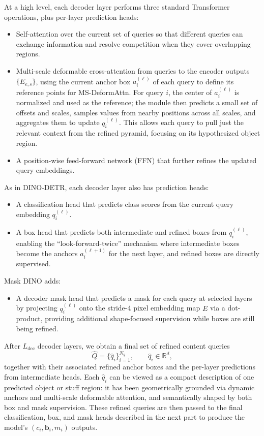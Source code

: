 \begin{enrichment}
\begin{enrichment}
		At a high level, each decoder layer performs three standard Transformer operations, plus per-layer prediction heads:
		\begin{itemize}
			\item Self-attention over the current set of queries so that different queries can exchange information and resolve competition when they cover overlapping regions.
			\item Multi-scale deformable cross-attention from queries to the encoder outputs $\{E_{e,s}\}$, using the current anchor box $a_i^{(\ell)}$ of each query to define its reference points for MS-DeformAttn.
			For query $i$, the center of $a_i^{(\ell)}$ is normalized and used as the reference; the module then predicts a small set of offsets and scales, samples values from nearby positions across all scales, and aggregates them to update $q_i^{(\ell)}$.
			This allows each query to pull just the relevant context from the refined pyramid, focusing on its hypothesized object region.
			\item A position-wise feed-forward network (FFN) that further refines the updated query embeddings.
		\end{itemize}
		
		As in DINO-DETR, each decoder layer also has prediction heads:
		\begin{itemize}
			\item A classification head that predicts class scores from the current query embedding $q_i^{(\ell)}$.
			\item A box head that predicts both intermediate and refined boxes from $q_i^{(\ell)}$, enabling the ``look-forward-twice'' mechanism where intermediate boxes become the anchors $a_i^{(\ell+1)}$ for the next layer, and refined boxes are directly supervised.
		\end{itemize}
		Mask DINO adds:
		\begin{itemize}
			\item A decoder mask head that predicts a mask for each query at selected layers by projecting $q_i^{(\ell)}$ onto the stride-4 pixel embedding map $E$ via a dot-product, providing additional shape-focused supervision while boxes are still being refined.
		\end{itemize}
		
		After $L_{\text{dec}}$ decoder layers, we obtain a final set of refined content queries
		\[
		\hat Q = \{\hat q_i\}_{i=1}^{N_q}, \qquad \hat q_i \in \mathbb{R}^d,
		\]
		together with their associated refined anchor boxes and the per-layer predictions from intermediate heads.
		Each $\hat q_i$ can be viewed as a compact description of one predicted object or stuff region: it has been geometrically grounded via dynamic anchors and multi-scale deformable attention, and semantically shaped by both box and mask supervision.
		These refined queries are then passed to the final classification, box, and mask heads described in the next part to produce the model’s $(c_i,\mathbf{b}_i,m_i)$ outputs.
		

\end{enrichment}
\end{enrichment}
